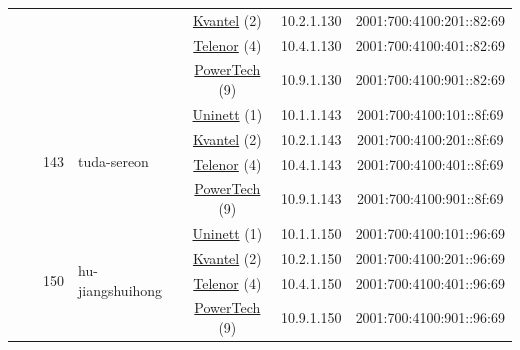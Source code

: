 \begin{small}
\begin{center}
\begin{longtable}{|c|c|c|c|c|c|c|c|}
  &  &  &  & \multicolumn{2}{|c|}{\tiny{\href{http://kvantel.no}{Kvantel} (2)}} & \tiny{10.2.1.130} & \tiny{2001:700:4100:201::82:69} \\* \cline{5-5}\cline{6-6}\cline{7-7}\cline{8-8}
  &  &  &  & \multicolumn{2}{|c|}{\tiny{\href{https://www.telenor.no}{Telenor} (4)}} & \tiny{10.4.1.130} & \tiny{2001:700:4100:401::82:69} \\* \cline{5-5}\cline{6-6}\cline{7-7}\cline{8-8}
  &  &  &  & \multicolumn{2}{|c|}{\tiny{\href{http://www.powertech.no}{PowerTech} (9)}} & \tiny{10.9.1.130} & \tiny{2001:700:4100:901::82:69} \\* \cline{3-3}\cline{4-4}\cline{5-5}\cline{6-6}\cline{7-7}\cline{8-8}
  &  & \multirow{4}{*}{\tiny{143}} & \multicolumn{1}{|l|}{\multirow{4}{*}{\tiny{tuda-sereon}}} & \multicolumn{2}{|c|}{\tiny{\href{https://www.uninett.no}{Uninett} (1)}} & \tiny{10.1.1.143} & \tiny{2001:700:4100:101::8f:69} \\* \cline{5-5}\cline{6-6}\cline{7-7}\cline{8-8}
  &  &  &  & \multicolumn{2}{|c|}{\tiny{\href{http://kvantel.no}{Kvantel} (2)}} & \tiny{10.2.1.143} & \tiny{2001:700:4100:201::8f:69} \\* \cline{5-5}\cline{6-6}\cline{7-7}\cline{8-8}
  &  &  &  & \multicolumn{2}{|c|}{\tiny{\href{https://www.telenor.no}{Telenor} (4)}} & \tiny{10.4.1.143} & \tiny{2001:700:4100:401::8f:69} \\* \cline{5-5}\cline{6-6}\cline{7-7}\cline{8-8}
  &  &  &  & \multicolumn{2}{|c|}{\tiny{\href{http://www.powertech.no}{PowerTech} (9)}} & \tiny{10.9.1.143} & \tiny{2001:700:4100:901::8f:69} \\* \cline{3-3}\cline{4-4}\cline{5-5}\cline{6-6}\cline{7-7}\cline{8-8}
  &  & \multirow{4}{*}{\tiny{150}} & \multicolumn{1}{|l|}{\multirow{4}{*}{\tiny{hu-jiangshuihong}}} & \multicolumn{2}{|c|}{\tiny{\href{https://www.uninett.no}{Uninett} (1)}} & \tiny{10.1.1.150} & \tiny{2001:700:4100:101::96:69} \\* \cline{5-5}\cline{6-6}\cline{7-7}\cline{8-8}
  &  &  &  & \multicolumn{2}{|c|}{\tiny{\href{http://kvantel.no}{Kvantel} (2)}} & \tiny{10.2.1.150} & \tiny{2001:700:4100:201::96:69} \\* \cline{5-5}\cline{6-6}\cline{7-7}\cline{8-8}
  &  &  &  & \multicolumn{2}{|c|}{\tiny{\href{https://www.telenor.no}{Telenor} (4)}} & \tiny{10.4.1.150} & \tiny{2001:700:4100:401::96:69} \\* \cline{5-5}\cline{6-6}\cline{7-7}\cline{8-8}
  &  &  &  & \multicolumn{2}{|c|}{\tiny{\href{http://www.powertech.no}{PowerTech} (9)}} & \tiny{10.9.1.150} & \tiny{2001:700:4100:901::96:69} \\* \cline{3-3}\cline{4-4}\cline{5-5}\cline{6-6}\cline{7-7}\cline{8-8}

\end{longtable}
\end{center}
\end{small}
